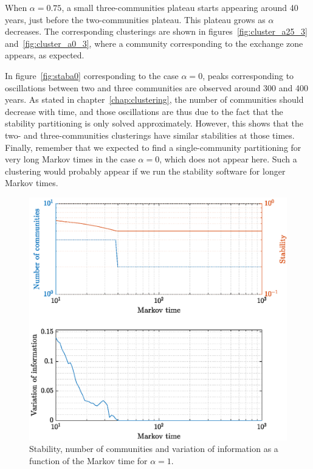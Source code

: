 When $\alpha = 0.75$, a small three-communities plateau starts appearing around 40 years, just before the two-communities plateau. This plateau grows as $\alpha$ decreases. The corresponding clusterings are shown in figures~\ref{fig:cluster_a25_3} and~\ref{fig:cluster_a0_3}, where a community corresponding to the exchange zone appears, as expected.

In figure~\ref{fig:staba0} corresponding to the case $\alpha = 0$, peaks corresponding to oscillations between two and three communities are observed around 300 and 400 years. As stated in chapter~\ref{chap:clustering}, the number of communities should decrease with time, and those oscillations are thus due to the fact that the stability partitioning is only solved approximately. However, this shows that the two- and three-communities clusterings have similar stabilities at those times. Finally, remember that we expected to find a single-community partitioning for very long Markov times in the case $\alpha = 0$, which does not appear here. Such a clustering would probably appear if we run the stability software for longer Markov times.


\begin{figure}[!htp]
	\centering
	\includegraphics[width = .7\textwidth, height = .4\textheight]{fig/problem2box/stab_a1.eps}
	\caption{Stability, number of communities and variation of information as a function of the Markov time for $\alpha = 1$.}
	\label{fig:staba1}
\end{figure}

